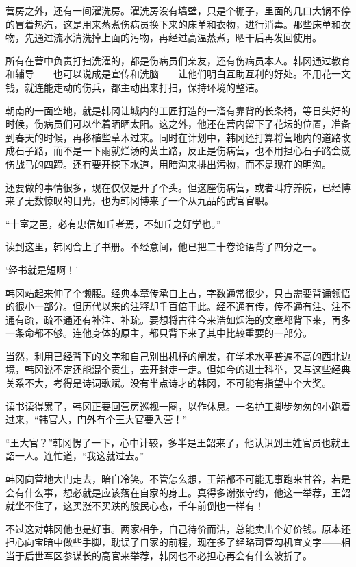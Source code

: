 营房之外，还有一间濯洗房。濯洗房没有墙壁，只是个棚子，里面的几口大锅不停的冒着热汽，这是用来蒸煮伤病员换下来的床单和衣物，进行消毒。那些床单和衣物，先通过流水清洗掉上面的污物，再经过高温蒸煮，晒干后再发回使用。

所有在营中负责打扫洗濯的，都是伤病员们亲友，还有伤病员本人。韩冈通过教育和辅导——也可以说成是宣传和洗脑——让他们明白互助互利的好处。不用花一文钱，就连能走动的伤兵，都主动出来打扫，保持环境的整洁。

朝南的一面空地，就是韩冈让城内的工匠打造的一溜有靠背的长条椅，等日头好的时候，伤病员们可以坐着晒晒太阳。这之外，他还在营内留下了花坛的位置，准备到春天的时候，再移植些草木过来。同时在计划中，韩冈还打算将营地内的道路改成石子路，而不是一下雨就烂汤的黄土路，反正是伤病营，也不用担心石子路会崴伤战马的四蹄。还有要开挖下水道，用暗沟来排出污物，而不是现在的明沟。

还要做的事情很多，现在仅仅是开了个头。但这座伤病营，或者叫疗养院，已经博来了无数惊叹的目光，也为韩冈博来了一个从九品的武官官职。

“十室之邑，必有忠信如丘者焉，不如丘之好学也。”

读到这里，韩冈合上了书册。不经意间，他已把二十卷论语背了四分之一。

‘经书就是短啊！’

韩冈站起来伸了个懒腰。经典本章传承自上古，字数通常很少，只占需要背诵领悟的很小一部分。但历代以来的注释却千百倍于此。经不通有传，传不通有注、注不通有疏，疏不通还有补注、补疏。要想将古往今来浩如烟海的文章都背下来，再多一条命都不够。连他身体的原主，都只背下来了其中比较重要的一部分。

当然，利用已经背下的文字和自己别出机杼的阐发，在学术水平普遍不高的西北边境，韩冈说不定还能混个贡生，去开封走一走。但如今的进士科举，又与这些经典关系不大，考得是诗词歌赋。没有半点诗才的韩冈，不可能有指望中个大奖。

读书读得累了，韩冈正要回营房巡视一圈，以作休息。一名护工脚步匆匆的小跑着过来，“韩官人，门外有个王大官要入营！”

“王大官？”韩冈愣了一下，心中计较，多半是王韶来了，他认识到王姓官员也就王韶一人。连忙道，“我这就过去。”

韩冈向营地大门走去，暗自冷笑。不管怎么想，王韶都不可能无事跑来甘谷，若是会有什么事，想必就是应该落在自家的身上。真得多谢张守约，他这一举荐，王韶就坐不住了，这买涨不买跌的股民心态，千年前倒也一样有！

不过这对韩冈他也是好事。两家相争，自己待价而沽，总能卖出个好价钱。原本还担心向宝暗中做些手脚，耽误了自家的前程，现在多了经略司管勾机宜文字——相当于后世军区参谋长的高官来举荐，韩冈也不必担心再会有什么波折了。

